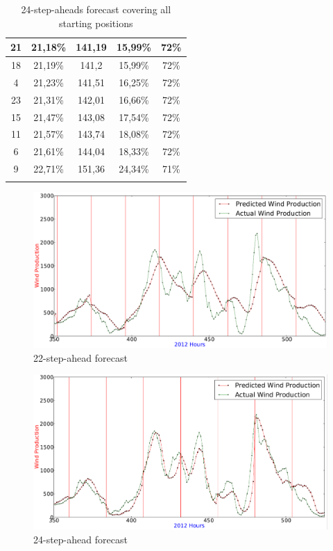 \begin{center}
\begin{longtable}{|c|c|c|c|c|}
21 & 21,18\% & 141,19 & 15,99\% & 72\%  \\ \hline
18 & 21,19\% & 141,2 & 15,99\% & 72\%  \\ \hline
4 & 21,23\% & 141,51 & 16,25\% & 72\%  \\ \hline
23 & 21,31\% & 142,01 & 16,66\% & 72\%  \\ \hline
15 & 21,47\% & 143,08 & 17,54\% & 72\%  \\ \hline
11 & 21,57\% & 143,74 & 18,08\% & 72\%  \\ \hline
6 & 21,61\% & 144,04 & 18,33\% & 72\%  \\ \hline
9 & 22,71\% & 151,36 & 24,34\% & 71\%  \\ \hline
\caption{24-step-aheads forecast covering all starting positions}
\label{table:stepAheadForecastingWindProductionStartingPositions}
\end{longtable}
\end{center}

\begin{figure}[H]
\centering
\includegraphics[width=0.99\linewidth]{billeder/best22vsbest24Ahead.png}
\caption{22-step-ahead forecast}
\label{fig:best22vsbest24Ahead}
\end{figure}

\begin{figure}[H]
\centering
\includegraphics[width=0.99\linewidth]{billeder/best24AheadPredictionWithLines.png}
\caption{24-step-ahead forecast}
\label{fig:best24AheadPredictionWithLines}
\end{figure} 

